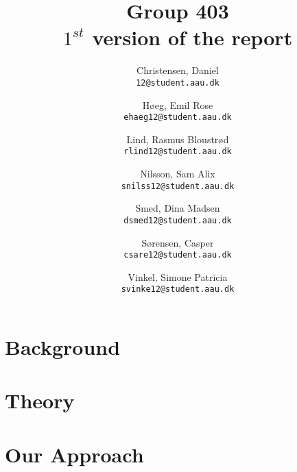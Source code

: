 \documentclass[12pt,a4paper]{report}
\author{
	Christensen, Daniel\\
	\texttt{12@student.aau.dk}
	\and
	Høeg, Emil Rose \\
	\texttt{ehaeg12@student.aau.dk}
	\and
	Lind, Rasmus Bloustrød\\
	\texttt{rlind12@student.aau.dk}
	\and
	Nilsson, Sam Alix \\
	\texttt{snilss12@student.aau.dk}
	\and
	Smed, Dina Madsen\\
	\texttt{dsmed12@student.aau.dk}
	\and
	Sørensen, Casper\\
	\texttt{csare12@student.aau.dk}
	\and
	Vinkel, Simone Patricia \\
	\texttt{svinke12@student.aau.dk}
}
\title{Group 403\\
$1^{st}$ version of the report}
\begin{document}
\maketitle
\tableofcontents
\chapter{Background}



%


\chapter{Theory}






\chapter{Our Approach}





\end{document}
